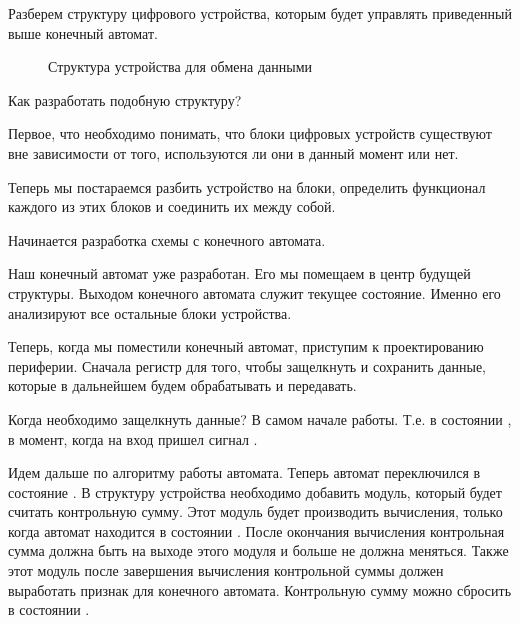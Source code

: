 \par{Разберем структуру цифрового устройства, которым будет управлять приведенный выше конечный автомат.}

\begin{figure}[H]
  \centering
  \def\svgwidth{\columnwidth}
  
  \caption{Структура устройства для обмена данными}
\end{figure}

\par{Как разработать подобную структуру?}

\par{Первое, что необходимо понимать, что блоки цифровых устройств существуют вне зависимости от того, используются ли они в данный момент или нет.}

\par{Теперь мы постараемся разбить устройство на блоки, определить функционал каждого из этих блоков и соединить их между собой.}

\par{Начинается разработка схемы с конечного автомата.}

\par{Наш конечный автомат уже разработан. Его мы помещаем в центр будущей структуры. Выходом конечного автомата служит текущее состояние. Именно его анализируют все остальные блоки устройства.}

\par{Теперь, когда мы поместили конечный автомат, приступим к проектированию периферии. Сначала регистр для того, чтобы защелкнуть и сохранить данные, которые в дальнейшем будем обрабатывать и передавать.}

\par{Когда необходимо защелкнуть данные? В самом начале работы. Т.е. в состоянии , в момент, когда на вход пришел сигнал .}

\par{Идем дальше по алгоритму работы автомата. Теперь автомат переключился в состояние . В структуру устройства необходимо добавить модуль, который будет считать контрольную сумму. Этот модуль будет производить вычисления, только когда автомат находится в состоянии . После окончания вычисления контрольная сумма должна быть на выходе этого модуля и больше не должна меняться. Также этот модуль после завершения вычисления контрольной суммы должен выработать признак  для конечного автомата. Контрольную сумму можно сбросить в состоянии .}

